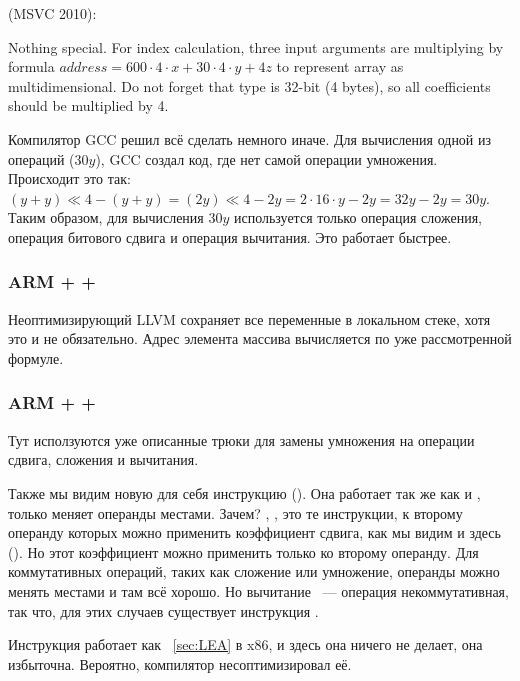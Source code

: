  (MSVC 2010):



{Nothing special. For index calculation, three input arguments are multiplying 
by formula $address=600 \cdot 4 \cdot x + 30 \cdot 4 \cdot y + 4z$ to represent array as multidimensional.
Do not forget that \Tint type is 32-bit (4 bytes), so all coefficients should be multiplied by 4.}



Компилятор GCC решил всё сделать немного иначе. 
Для вычисления одной из операций ($30y$), GCC создал код, где нет самой операции умножения. 
Происходит это так: $(y+y) \ll 4 - (y+y) = (2y) \ll 4 - 2y = 2 \cdot 16 \cdot y - 2y = 32y - 2y = 30y$. 
Таким образом, для вычисления $30y$
используется только операция сложения, операция битового сдвига и операция вычитания. Это работает быстрее.

\subsubsection{ARM + \NonOptimizingXcode + \ThumbMode}



Неоптимизирующий LLVM сохраняет все переменные в локальном стеке, хотя это и не обязательно. 
Адрес элемента массива вычисляется по уже рассмотренной формуле.

\subsubsection{ARM + \OptimizingXcode + \ThumbMode}



Тут исползуются уже описанные трюки для замены умножения на операции сдвига, сложения и вычитания.

Также мы видим новую для себя инструкцию  (). 
Она работает так же как и \SUB, только меняет операнды
местами. Зачем? \SUB, , это те инструкции, 
к второму операнду которых можно применить коэффициент сдвига, как мы видим
и здесь (). 
Но этот коэффициент можно применить только ко второму операнду. 
Для коммутативных операций, таких
как сложение или умножение, операнды можно менять местами и там всё хорошо. Но вычитание ~--- операция некоммутативная,
так что, для этих случаев существует инструкция .

Инструкция  работает как \LEA~\ref{sec:LEA} в x86, и здесь она ничего не делает, она избыточна. 
Вероятно, компилятор несоптимизировал её.

